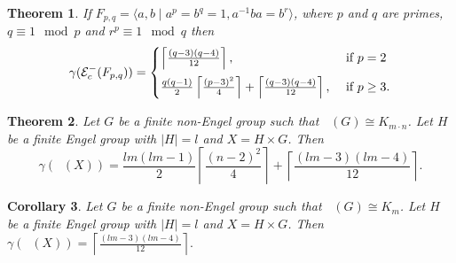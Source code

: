 \documentclass[reqno,12pt]{amsart}
\theoremstyle{plain}
\newtheorem{thm}{Theorem}[section]
\newtheorem{cor}[thm]{Corollary}
\theoremstyle{definition}
\newcommand{\coeng}{\mathop{\mathcal{E}_c^-}}
\begin{document}
\begin{thm} \label{pq-genus} 
If $F_{p, q}=\langle a,b \mid a^p=b^q=1, a^{-1}ba=b^r\rangle$, where $p$ and $q$ are primes, $q\equiv 1 \mod p$ and $r^p\equiv 1 \mod q$ then
\[
\gamma(\coeng(F_{p, q}))= \begin{cases}
\left\lceil \frac{(q-3)(q-4)}{12}\right
\rceil, &\text{ if } p = 2	\vspace{.2cm}\\

\frac{q(q - 1)}{2}\left\lceil\frac{(p-3)^2}{4}\right
\rceil + \left\lceil \frac{(q-3)(q-4)}{12}\right
\rceil, &\text{ if } p \geq 3.
\end{cases}
\]
\end{thm}

%
%

\begin{thm}\label{bipar-genus} 
Let $G$ be a finite non-Engel group such that $\coeng(G) \cong K_{m \cdot n}$. Let $H$ be a finite Engel group with $|H|=l$ and $X = H \times G$. Then  
\[
\gamma(\coeng(X)) =  \frac{lm(lm - 1)}{2}\left\lceil\frac{(n-2)^2}{4}\right
\rceil + \left\lceil \frac{(lm-3)(lm-4)}{12}\right
\rceil.
\]
\end{thm}

 
\begin{cor} 
Let $G$ be a finite non-Engel group such that $\coeng(G) \cong K_{m}$. Let $H$ be a finite Engel group with $|H|=l$  and $X = H \times G$. Then $\gamma(\coeng(X)) = \left\lceil \frac{(lm-3)(lm-4)}{12}\right\rceil.$
\end{cor}
\end{document}
